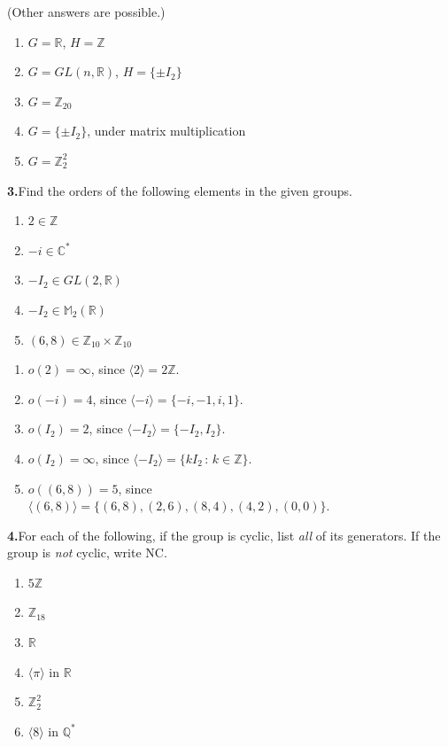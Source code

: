 \documentclass[10pt,]{book}
\theoremstyle{plain}
\theoremstyle{definition}
\theoremstyle{definition}
\theoremstyle{definition}
\theoremstyle{definition}
\numberwithin{equation}{section}
\def\Z{\mathbb{Z}}
\def\R{\mathbb{R}}
\def\Q{\mathbb{Q}}
\def\C{\mathbb{C}}
\def\M{\mathbb{M}}
\begin{document}
%
\par\smallskip
(Other answers are possible.) \leavevmode%
\begin{enumerate}[label=(\alph*)]
\item\hypertarget{li-218}{}\(G=\R\), \(H=\Z\)%
\item\hypertarget{li-219}{}\(G=GL(n,\R)\), \(H=\{\pm I_2\}\)%
\item\hypertarget{li-220}{}\(G=\Z_{20}\)%
\item\hypertarget{li-221}{}\(G=\{\pm I_2\}\), under matrix multiplication%
\item\hypertarget{li-222}{}\(G=\Z_2^2\)%
\end{enumerate}
%
\par\smallskip
\noindent\textbf{3.}\quad{}Find the orders of the following elements in the given groups. \leavevmode%
\begin{enumerate}[label=(\alph*)]
\item\hypertarget{li-223}{}\(2\in \Z\)%
\item\hypertarget{li-224}{}\(-i\in \C^*\)%
\item\hypertarget{li-225}{}\(-I_2\in GL(2,\R)\)%
\item\hypertarget{li-226}{}\(-I_2\in \M_2(\R)\)%
\item\hypertarget{li-227}{}\((6,8)\in \Z_{10}\times \Z_{10}\)%
\end{enumerate}
%
\par\smallskip
\leavevmode%
\begin{enumerate}[label=(\alph*)]
\item\hypertarget{li-228}{}\(o(2)=\infty\), since \(\langle 2\rangle =2\Z\).%
\item\hypertarget{li-229}{}\(o(-i)=4\), since \(\langle -i\rangle =\{-i,-1,i,1\}\).%
\item\hypertarget{li-230}{}\(o(I_2)=2\), since \(\langle -I_2\rangle =\{-I_2,I_2\}\).%
\item\hypertarget{li-231}{}\(o(I_2)=\infty\), since \(\langle -I_2\rangle =\{kI_2\,:\,k\in \Z\}\).%
\item\hypertarget{li-232}{}\(o((6,8))=5\), since \(\langle (6,8)\rangle =\{(6,8),(2,6),(8,4),(4,2),(0,0)\}\).%
\end{enumerate}
\par\smallskip
\noindent\textbf{4.}\quad{}For each of the following, if the group is cyclic, list \emph{all} of its generators. If the group is \emph{not} cyclic, write NC. \leavevmode%
\begin{enumerate}[label=(\alph*)]
\item\hypertarget{li-233}{}\(5\Z\)%
\item\hypertarget{li-234}{}\(\Z_{18}\)%
\item\hypertarget{li-235}{}\(\R\)%
\item\hypertarget{li-236}{}\(\langle \pi\rangle\) in \(\R\)%
\item\hypertarget{li-237}{}\(\Z_2^2\)%
\item\hypertarget{li-238}{}\(\langle 8\rangle\) in \(\Q^*\)%
\end{enumerate}
\end{document}

